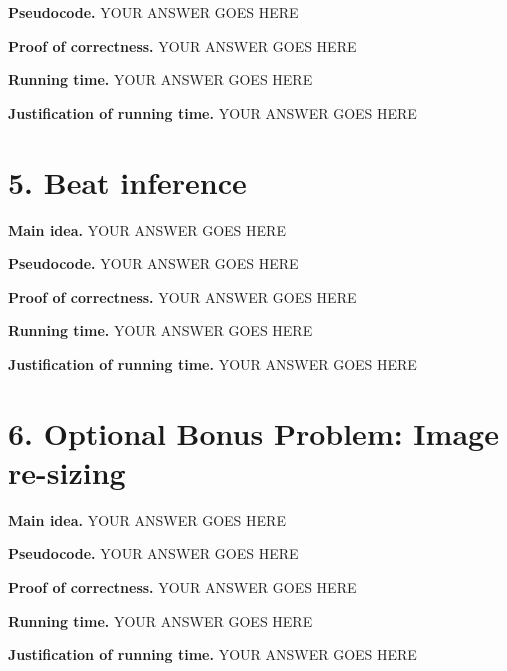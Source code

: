 \documentclass[11pt]{article}
\begin{document}
\noindent
\textbf{Pseudocode.}
YOUR ANSWER GOES HERE

\noindent
\textbf{Proof of correctness.}
YOUR ANSWER GOES HERE


\noindent
\textbf{Running time.}
YOUR ANSWER GOES HERE


\noindent
\textbf{Justification of running time.}
YOUR ANSWER GOES HERE


\newpage
\section*{5. Beat inference}
\noindent
\textbf{Main idea.}
YOUR ANSWER GOES HERE


\noindent
\textbf{Pseudocode.}
YOUR ANSWER GOES HERE

\noindent
\textbf{Proof of correctness.}
YOUR ANSWER GOES HERE


\noindent
\textbf{Running time.}
YOUR ANSWER GOES HERE


\noindent
\textbf{Justification of running time.}
YOUR ANSWER GOES HERE


\newpage
\section*{6. Optional Bonus Problem: Image re-sizing}
\noindent
\textbf{Main idea.}
YOUR ANSWER GOES HERE


\noindent
\textbf{Pseudocode.}
YOUR ANSWER GOES HERE

\noindent
\textbf{Proof of correctness.}
YOUR ANSWER GOES HERE


\noindent
\textbf{Running time.}
YOUR ANSWER GOES HERE


\noindent
\textbf{Justification of running time.}
YOUR ANSWER GOES HERE
\end{document}

